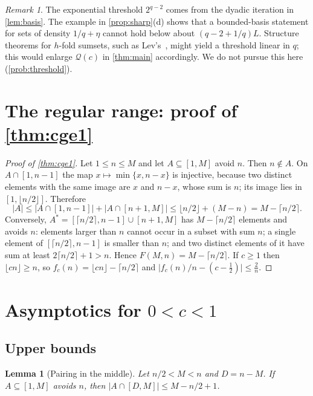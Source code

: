 \documentclass[11pt,reqno]{amsart}
\numberwithin{equation}{section}
\newtheorem{lemma}[theorem]{Lemma}
\theoremstyle{definition}
\theoremstyle{remark}
\newtheorem{remark}[theorem]{Remark}
\newcommand{\card}[1]{\lvert #1\rvert}
\newcommand{\floor}[1]{\lfloor #1\rfloor}
\newcommand{\ceil}[1]{\lceil #1\rceil}
\begin{document}
\begin{remark}\label{rem:threshold}
The exponential threshold $2^{q-2}$ comes from the dyadic iteration in \cref{lem:basis}. The example in \cref{prop:sharp}(d) shows that a bounded-basis statement for sets of density $1/q+\eta$ cannot hold below about $(q-2+1/q)L$. Structure theorems for $h$-fold sumsets, such as Lev's~\cite{Le97}, might yield a threshold linear in $q$; this would enlarge $\mathcal Q(c)$ in \cref{thm:main} accordingly. We do not pursue this here (\cref{prob:threshold}).
\end{remark}

\section{The regular range: proof of \texorpdfstring{\cref{thm:cge1}}{Theorem 1.1}}\label{sec:cge1}

\begin{proof}[Proof of \cref{thm:cge1}]
Let $1\le n\le M$ and let $A\subseteq[1,M]$ avoid $n$. Then $n\notin A$. On $A\cap[1,n-1]$ the map $x\mapsto\min\{x,n-x\}$ is injective, because two distinct elements with the same image are $x$ and $n-x$, whose sum is $n$; its image lies in $[1,\floor{n/2}]$. Therefore
\[
 \card A\le\card{A\cap[1,n-1]}+\card{A\cap[n+1,M]}\le\floor{n/2}+(M-n)=M-\ceil{n/2}.
\]
Conversely, $A^*=[\ceil{n/2},n-1]\cup[n+1,M]$ has $M-\ceil{n/2}$ elements and avoids $n$: elements larger than $n$ cannot occur in a subset with sum $n$; a single element of $[\ceil{n/2},n-1]$ is smaller than $n$; and two distinct elements of it have sum at least $2\ceil{n/2}+1>n$. Hence $F(M,n)=M-\ceil{n/2}$. If $c\ge1$ then $\floor{cn}\ge n$, so $f_c(n)=\floor{cn}-\ceil{n/2}$ and $\bigl|f_c(n)/n-(c-\frac12)\bigr|\le\frac2n$.
\end{proof}

\section{Asymptotics for \texorpdfstring{$0<c<1$}{0<c<1}}\label{sec:asymp}

\subsection{Upper bounds}

\begin{lemma}[Pairing in the middle]\label{lem:pairs}
Let $n/2<M<n$ and $D=n-M$. If $A\subseteq[1,M]$ avoids $n$, then $\card{A\cap[D,M]}\le M-n/2+1$.
\end{lemma}
\end{document}
